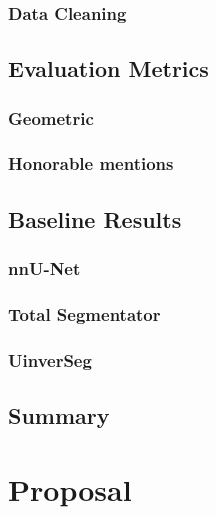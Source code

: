 \documentclass[11pt,twoside]{report}
\begin{document}
\subsection{Data Cleaning}\label{sect:data-cleaning}

\section{Evaluation Metrics}\label{sect:evaluation-metrics}

\subsection{Geometric}\label{sect:geometric}

\subsection{Honorable mentions}\label{sect:evaluation-metrics-honorable-mentions}

\section{Baseline Results}\label{sect:baseline-results}

\subsection{nnU-Net}\label{sect:results-nnu-net}

\subsection{Total Segmentator}\label{sect:results-totalseg}

\subsection{UinverSeg}\label{sect:results-universeg}

\section{Summary}\label{sect:results-summary}

\chapter{Proposal}\label{sect:proposal}

\end{document}

